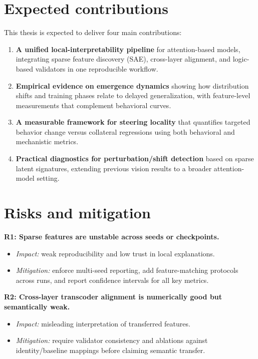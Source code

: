 \documentclass[../../ppgc-prop-tese.tex]{subfiles}
\begin{document}
\section{Expected contributions}
This thesis is expected to deliver four main contributions:
\begin{enumerate}
    \item \textbf{A unified local-interpretability pipeline} for attention-based models, integrating sparse feature discovery (SAE), cross-layer alignment, and logic-based validators in one reproducible workflow.
    \item \textbf{Empirical evidence on emergence dynamics} showing how distribution shifts and training phases relate to delayed generalization, with feature-level measurements that complement behavioral curves.
    \item \textbf{A measurable framework for steering locality} that quantifies targeted behavior change versus collateral regressions using both behavioral and mechanistic metrics.
    \item \textbf{Practical diagnostics for perturbation/shift detection} based on sparse latent signatures, extending previous vision results \cite{carvalho2026interpretable_stego_detection_sae} to a broader attention-model setting.
\end{enumerate}

\section{Risks and mitigation}
\textbf{R1: Sparse features are unstable across seeds or checkpoints.}
\begin{itemize}
    \item \textit{Impact:} weak reproducibility and low trust in local explanations.
    \item \textit{Mitigation:} enforce multi-seed reporting, add feature-matching protocols across runs, and report confidence intervals for all key metrics.
\end{itemize}

\textbf{R2: Cross-layer transcoder alignment is numerically good but semantically weak.}
\begin{itemize}
    \item \textit{Impact:} misleading interpretation of transferred features.
    \item \textit{Mitigation:} require validator consistency and ablations against identity/baseline mappings before claiming semantic transfer.
\end{itemize}
\end{document}
